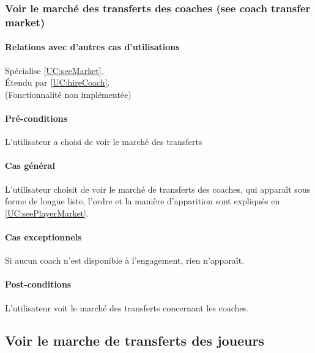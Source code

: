 \subsubsection{Voir le marché des transferts des coaches (see coach transfer market)}
\label{UC:seeCoachMarket}
\paragraph{Relations avec d'autres cas d'utilisations}
Spécialise \ref{UC:seeMarket}.\\
Étendu par \ref{UC:hireCoach}.
\\(Fonctionnalité non implémentée)
\paragraph{Pré-conditions}
\begin{list}{}{\leftmargin=1.5em}
\item{L'utilisateur a choisi de voir le marché des transferts}
\end{list}
\paragraph{Cas général}
L'utilisateur choisit de voir le marché de transferts des coaches, qui apparaît sous forme de longue liste, l'ordre et la manière d'apparition sont expliqués en \ref{UC:seePlayerMarket}.
\paragraph{Cas exceptionnels}
Si aucun coach n'est disponible à l'engagement, rien n'apparaît.
\paragraph{Post-conditions}
\begin{list}{}{\leftmargin=1.5em}
\item{L'utilisateur voit le marché des transferts concernant les coaches. }
\end{list}

\subsection{Voir le marche de transferts des joueurs}

